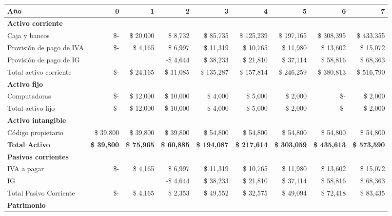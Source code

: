 \begin{center}
\footnotesize
\begin{adjustbox}{width=\textwidth,center}
\begin{tabular}{l|rrrrrrrr}
\hline
\textbf{Año} & \textbf{0} & \textbf{1} & \textbf{2} & \textbf{3} & \textbf{4} & \textbf{5} & \textbf{6} & \textbf{7} \\
\hline
\multicolumn{9}{l}{\textbf{Activo corriente}} \\
\hline
Caja y bancos & \$- & \$ 20,000 & \$ 8,732 & \$ 85,735 & \$ 125,239 & \$ 197,165 & \$ 308,395 & \$ 433,355 \\
Provisión de pago de IVA & \$- & \$ 4,165 & \$ 6,997 & \$ 11,319 & \$ 10,765 & \$ 11,980 & \$ 13,602 & \$ 15,072 \\
Provisión de pago de IG & & & -\$ 4,644 & \$ 38,233 & \$ 21,810 & \$ 37,114 & \$ 58,816 & \$ 68,363 \\
\hline
Total activo corriente & \$- & \$ 24,165 & \$ 11,085 & \$ 135,287 & \$ 157,814 & \$ 246,259 & \$ 380,813 & \$ 516,790 \\
\hline
\multicolumn{9}{l}{\textbf{Activo fijo}} \\
\hline
Computadoras & \$- & \$ 12,000 & \$ 10,000 & \$ 4,000 & \$ 5,000 & \$ 2,000 & \$- & \$ 2,000 \\
\hline
Total activo fijo & \$- & \$ 12,000 & \$ 10,000 & \$ 4,000 & \$ 5,000 & \$ 2,000 & \$- & \$ 2,000 \\
\hline
\multicolumn{9}{l}{\textbf{Activo intangible}} \\
\hline
Código propietario & \$ 39,800 & \$ 39,800 & \$ 39,800 & \$ 54,800 & \$ 54,800 & \$ 54,800 & \$ 54,800 & \$ 54,800 \\
\hline
\textbf{Total Activo} & \textbf{\$ 39,800} & \textbf{\$ 75,965} & \textbf{\$ 60,885} & \textbf{\$ 194,087} & \textbf{\$ 217,614} & \textbf{\$ 303,059} & \textbf{\$ 435,613} & \textbf{\$ 573,590} \\
\hline
\hline
\multicolumn{9}{l}{\textbf{Pasivos corrientes}} \\
\hline
IVA a pagar & \$- & \$ 4,165 & \$ 6,997 & \$ 11,319 & \$ 10,765 & \$ 11,980 & \$ 13,602 & \$ 15,072 \\
IG & & & -\$ 4,644 & \$ 38,233 & \$ 21,810 & \$ 37,114 & \$ 58,816 & \$ 68,363 \\
\hline
Total Pasivo Corriente & \$- & \$ 4,165 & \$ 2,353 & \$ 49,552 & \$ 32,575 & \$ 49,094 & \$ 72,418 & \$ 83,435 \\
\hline
\hline
\multicolumn{9}{l}{\textbf{Patrimonio}} \\

\end{tabular}
\end{adjustbox}
\end{center}
